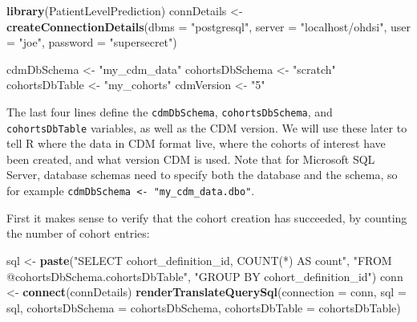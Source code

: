 \documentclass[11pt]{book}
\newenvironment{Shaded}{\begin{snugshade}}{\end{snugshade}}
\newcommand{\DataTypeTok}[1]{\textcolor[rgb]{0.13,0.29,0.53}{#1}}
\newcommand{\KeywordTok}[1]{\textcolor[rgb]{0.13,0.29,0.53}{\textbf{#1}}}
\newcommand{\NormalTok}[1]{#1}
\newcommand{\StringTok}[1]{\textcolor[rgb]{0.31,0.60,0.02}{#1}}
\theoremstyle{definition}
\theoremstyle{definition}
\theoremstyle{definition}
\theoremstyle{remark}
\begin{document}
\begin{Shaded}
\begin{Highlighting}[]
\KeywordTok{library}\NormalTok{(PatientLevelPrediction)}
\NormalTok{connDetails <-}\StringTok{ }\KeywordTok{createConnectionDetails}\NormalTok{(}\DataTypeTok{dbms =} \StringTok{"postgresql"}\NormalTok{,}
                                       \DataTypeTok{server =} \StringTok{"localhost/ohdsi"}\NormalTok{,}
                                       \DataTypeTok{user =} \StringTok{"joe"}\NormalTok{,}
                                       \DataTypeTok{password =} \StringTok{"supersecret"}\NormalTok{)}

\NormalTok{cdmDbSchema <-}\StringTok{ "my_cdm_data"}
\NormalTok{cohortsDbSchema <-}\StringTok{ "scratch"}
\NormalTok{cohortsDbTable <-}\StringTok{ "my_cohorts"}
\NormalTok{cdmVersion <-}\StringTok{ "5"}
\end{Highlighting}
\end{Shaded}

The last four lines define the \texttt{cdmDbSchema}, \texttt{cohortsDbSchema}, and \texttt{cohortsDbTable} variables, as well as the CDM version. We will use these later to tell R where the data in CDM format live, where the cohorts of interest have been created, and what version CDM is used. Note that for Microsoft SQL Server, database schemas need to specify both the database and the schema, so for example \texttt{cdmDbSchema\ \textless{}-\ "my\_cdm\_data.dbo"}.

First it makes sense to verify that the cohort creation has succeeded, by counting the number of cohort entries:

\begin{Shaded}
\begin{Highlighting}[]
\NormalTok{sql <-}\StringTok{ }\KeywordTok{paste}\NormalTok{(}\StringTok{"SELECT cohort_definition_id, COUNT(*) AS count"}\NormalTok{,}
\StringTok{"FROM @cohortsDbSchema.cohortsDbTable"}\NormalTok{,}
\StringTok{"GROUP BY cohort_definition_id"}\NormalTok{)}
\NormalTok{conn <-}\StringTok{ }\KeywordTok{connect}\NormalTok{(connDetails)}
\KeywordTok{renderTranslateQuerySql}\NormalTok{(}\DataTypeTok{connection =}\NormalTok{ conn, }
                        \DataTypeTok{sql =}\NormalTok{ sql,}
                        \DataTypeTok{cohortsDbSchema =}\NormalTok{ cohortsDbSchema,}
                        \DataTypeTok{cohortsDbTable =}\NormalTok{ cohortsDbTable)}
\end{Highlighting}
\end{Shaded}
\end{document}
